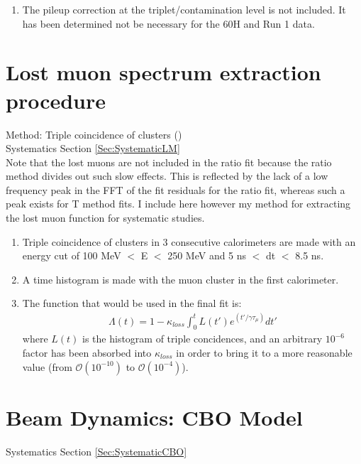 \begin{enumerate}
		\item{The pileup correction at the triplet/contamination level is not included. It has been determined not be necessary for the 60H and Run 1 data.}
	\end{enumerate}


\section{Lost muon spectrum extraction procedure}
\label{Sec:LM}

	Method: Triple coincidence of clusters () \\
	\noindent Systematics Section \ref{Sec:SystematicLM} \\

	Note that the lost muons are not included in the ratio fit because the ratio method divides out such slow effects. This is reflected by the lack of a low frequency peak in the FFT of the fit residuals for the ratio fit, whereas such a peak exists for T method fits. I include here however my method for extracting the lost muon function for systematic studies.

	\begin{enumerate}
		\item{Triple coincidence of clusters in 3 consecutive calorimeters are made with an energy cut of 100 MeV $<$ E $<$ 250 MeV and 5 ns $<$ dt $<$ 8.5 ns.}
		\item{A time histogram is made with the muon cluster in the first calorimeter.}
		\item{The function that would be used in the final fit is:
			\begin{gather}
				\Lambda(t) = 1 - \kappa_{loss} \int_{0}^{t} L(t')e^{(t'/\gamma\tau_{\mu})} dt'
			\end{gather}
		where $L(t)$ is the histogram of triple concidences, and an arbitrary $10^{-6}$ factor has been absorbed into $\kappa_{loss}$ in order to bring it to a more reasonable value (from $\mathcal{O}(10^{-10})$ to $\mathcal{O}(10^{-4})$).}
	\end{enumerate}


\section{Beam Dynamics: CBO Model}
\label{Sec:CBO}

	\noindent Systematics Section \ref{Sec:SystematicCBO}

